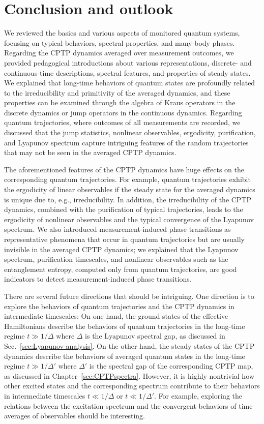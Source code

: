 \documentclass[preprint,pteplogo]{ptephy_v2}%
\numberwithin{equation}{section}
\theoremstyle{definition}
\begin{document}
\section{Conclusion and outlook}
\label{sec:conclusion}
We reviewed the basics and various aspects of monitored quantum systems, focusing on typical behaviors, spectral properties, and many-body phases. 
Regarding the CPTP dynamics averaged over measurement outcomes, we provided pedagogical introductions about various representations, discrete- and continuous-time descriptions, spectral features, and properties of steady states. 
We explained that long-time behaviors of quantum states are profoundly related to the irreducibility and primitivity of the averaged dynamics, and these properties can be examined through the algebra of Kraus operators in the discrete dynamics or jump operators in the continuous dynamics. 
Regarding quantum trajectories, where outcomes of all measurements are recorded, we discussed that the jump statistics, nonlinear observables, ergodicity, purification, and Lyapunov spectrum capture intriguing features of the random trajectories that may not be seen in the averaged CPTP dynamics. 

The aforementioned features of the CPTP dynamics have huge effects on the corresponding quantum trajectories. 
For example, quantum trajectories exhibit the ergodicity of linear observables if the steady state for the averaged dynamics is unique due to, e.g., irreducibility. 
In addition, the irreducibility of the CPTP dynamics, combined with the purification of typical trajectories, leads to the ergodicity of nonlinear observables and the typical convergence of the Lyapunov spectrum. 
We also introduced measurement-induced phase transitions as representative phenomena that occur in quantum trajectories but are usually invisible in the averaged CPTP dynamics; we  explained that the Lyapunov spectrum, purification timescales, and nonlinear observables such as the entanglement entropy, computed only from quantum trajectories, are good indicators to detect measurement-induced phase transitions. 

There are several future directions that should be intriguing. 
One direction is to explore the behaviors of quantum trajectories and the CPTP dynamics in intermediate timescales:
On one hand, the ground states of the effective Hamiltonians describe the behaviors of quantum trajectories in the long-time regime $t \gg 1/\Delta$ where $\Delta$ is the Lyapunov spectral gap, as discussed in Sec.~\ref{sec:Lyapunov-analysis}. 
On the other hand, the steady states of the CPTP dynamics describe the behaviors of averaged quantum states in the long-time regime $t \gg 1/\Delta'$ where $\Delta'$ is the spectral gap of the corresponding CPTP map, as discussed in Chapter~\ref{sec:CPTPspectra}.
However, it is highly nontrivial how other excited states and the corresponding spectrum contribute to their behaviors in intermediate timescales $t \ll 1/\Delta$ or $t \ll 1/\Delta'$.
For example, exploring the relations between the excitation spectrum and the convergent behaviors of time averages of observables should be interesting. 
\end{document}
